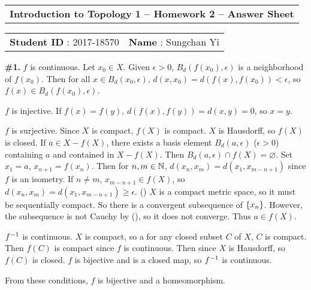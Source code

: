 \documentclass[a4paper,11pt]{article}
\begin{document}
\begin{tabular}{l}
    {\bfseries \Large  Introduction to Topology 1 -- Homework 2 -- Answer Sheet} \\
\end{tabular}

\vspace{3mm}

\begin{tabular}{c c}
    {\bfseries \large Student ID} : 2017-18570 \hspace{40mm} & {\bfseries \large Name} : Sungchan Yi  \hspace{30mm} \\
\end{tabular}

\vspace{7mm}

\begin{minipage}[t][260mm]{90mm}
    {\bfseries \large \#1.} \(f\) is continuous. Let \(x_0 \in X\). Given \(\epsilon > 0\), \(B_d(f(x_0), \epsilon)\) is a neighborhood of \(f(x_0)\). Then for all \(x \in B_d(x_0, \epsilon)\), \(d(x, x_0) = d(f(x), f(x_0)) < \epsilon\), so \(f(x) \in B_d(f(x_0), \epsilon)\).

    \(f\) is injective. If \(f(x) = f(y)\), \(d(f(x), f(y)) = d(x, y) = 0\), so \(x = y\).

    \(f\) is surjective. Since \(X\) is compact, \(f(X)\) is compact. \(X\) is Hausdorff, so \(f(X)\) is closed. If \(a \in X - f(X)\), there exists a basis element \(B_d(a, \epsilon)\) (\(\epsilon > 0\)) containing \(a\) and contained in \(X - f(X)\). Then \(B_d(a, \epsilon) \cap f(X) = \varnothing\). Set \(x_1 = a\), \(x_{n+1} = f(x_n)\). Then for \(n, m \in \mathbb{N}\), \(d(x_n, x_m) = d(x_1, x_{m-n+1})\) since \(f\) is an isometry. If \(n \neq m\), \(x_{m-n+1} \in f(X)\), so \(d(x_n, x_m) = d(x_1, x_{m-n+1}) \geq \epsilon\). (\mast) \(X\) is a compact metric space, so it must be sequentially compact. So there is a convergent subsequence of \(\left\{ x_n \right\}\). However, the subsequence is not Cauchy by (\mast), so it does not converge. Thus \(a \in f(X)\).

    \(f^{-1}\) is continuous. \(X\) is compact, so a for any closed subset \(C\) of \(X\), \(C\) is compact. Then \(f(C)\) is compact since \(f\) is continuous. Then since \(X\) is Hausdorff, so \(f(C)\) is closed. \(f\) is bijective and is a closed map, so \(f^{-1}\) is continuous.

    From these conditions, \(f\) is bijective and a homeomorphism.
\end{minipage}
{\color{gray}\vline}
\begin{minipage}[t][260mm]{90mm}
    \phantom{?}
\end{minipage}
\end{document}

